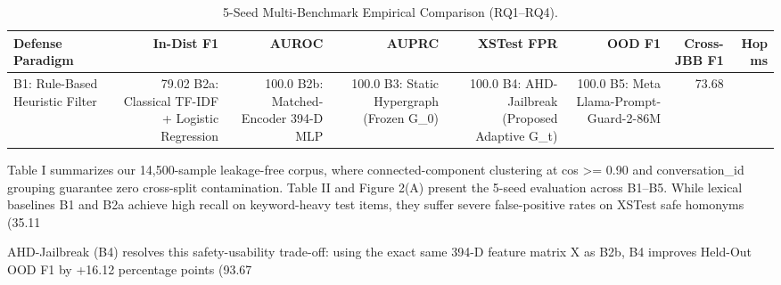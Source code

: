 \documentclass[10pt,twocolumn]{article}
\begin{document}
\begin{table}[t]
\centering
\caption{5-Seed Multi-Benchmark Empirical Comparison (RQ1--RQ4).}
\label{tab:master}
\footnotesize
\begin{tabularx}{\textwidth}{l r r r r r r r}
\toprule
\textbf{Defense Paradigm} & \textbf{In-Dist F1} & \textbf{AUROC} & \textbf{AUPRC} & \textbf{XSTest FPR} & \textbf{OOD F1} & \textbf{Cross-JBB F1} & \textbf{Hop ms} \\
\midrule
B1: Rule-Based Heuristic Filter & 79.02%
B2a: Classical TF-IDF + Logistic Regression & 100.0%
B2b: Matched-Encoder 394-D MLP & 100.0%
B3: Static Hypergraph (Frozen G_0) & 100.0%
B4: AHD-Jailbreak (Proposed Adaptive G_t) & 100.0%
B5: Meta Llama-Prompt-Guard-2-86M & 73.68%
\bottomrule
\end{tabularx}
\end{table}

Table I summarizes our 14,500-sample leakage-free corpus, where connected-component clustering at cos >= 0.90 and conversation_id grouping guarantee zero cross-split contamination. Table II and Figure 2(A) present the 5-seed evaluation across B1–B5. While lexical baselines B1 and B2a achieve high recall on keyword-heavy test items, they suffer severe false-positive rates on XSTest safe homonyms (35.11%

AHD-Jailbreak (B4) resolves this safety-usability trade-off: using the exact same 394-D feature matrix X as B2b, B4 improves Held-Out OOD F1 by +16.12 percentage points (93.67%
\end{document}
